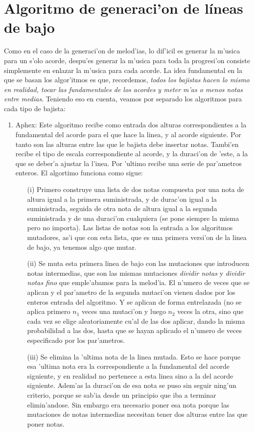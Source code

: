 \section{Algoritmo de generaci'on de l\'ineas de bajo}
Como en el caso de la generaci'on de melod'ias, lo dif'icil es generar la m'usica para un s'olo acorde, despu'es generar la m'usica para toda la progresi'on consiste simplemente en enlazar la m'usica para cada acorde. La idea fundamental en la que se basan los algor'itmos es que, recordemos, \emph{todos los bajistas hacen lo mismo en realidad, tocar las fundamentales de los acordes y meter m'as o menos notas entre medias}. Teniendo eso en cuenta, veamos por separado los algoritmos para cada tipo de bajista:
	\begin{enumerate}
	\item Aphex: Este algoritmo recibe como entrada dos alturas correspondientes a la fundamental del acorde para el que hace la linea, y al acorde siguiente. Por tanto son las alturas entre las que le bajista debe insertar notas. Tambi'en recibe  el tipo de escala correspondiente al acorde, y la duraci'on de 'este, a la que se deber'a ajustar la l'inea. Por 'ultimo recibe una serie de par'ametros enteros. El algortimo funciona como sigue:
		\begin{enumerate}
		\item[(i)] Primero construye una lista de dos notas compuesta por una nota de altura igual a la primera suministrada, y de durac'on igual a la suministrada, seguida de otra nota de altura igual a la segunda suministrada y de una duraci'on cualquiera (se pone siempre la misma pero no importa). Las listas de notas son la entrada a los algoritmos mutadores, as'i que con esta lista, que es una primera versi'on de la linea de bajo, ya tenemos algo que mutar.
		\item[(ii)] Se muta esta primera linea de bajo con las mutaciones que introducen notas intermedias, que son las mismas mutaciones \emph{dividir notas} y \emph{dividir notas fino} que emple'abamos para la melod'ia. El n'umero de veces que se aplican y el par'ametro de la segunda mutaci'on vienen dados por los enteros entrada del algoritmo. Y se aplican de forma entrelazada (no se aplica primero $n_{1}$ veces una mutaci'on y luego $n_{2}$ veces la otra, sino que cada vez se elige aleatoriamente cu'al de las dos aplicar, dando la misma probabilidad a las dos, hasta que se hayan aplicado el n'umero de veces especificado por los par'ametros.
		\item[(iii)] Se elimina la 'ultima nota de la linea mutada. Esto se hace porque esa 'ultima nota era la correspondiente a la fundamental del acorde siguiente, y en realidad no pertenece a esta linea sino a la del acorde siguiente. Adem'as la duraci'on de esa nota se puso sin seguir ning'un criterio, porque se sab'ia desde un principio que iba a terminar elimin'andose. Sin embargo era necesario poner esa nota porque las mutaciones de notas intermedias necesitan tener dos alturas entre las que poner notas.

\end{enumerate}
\end{enumerate}
